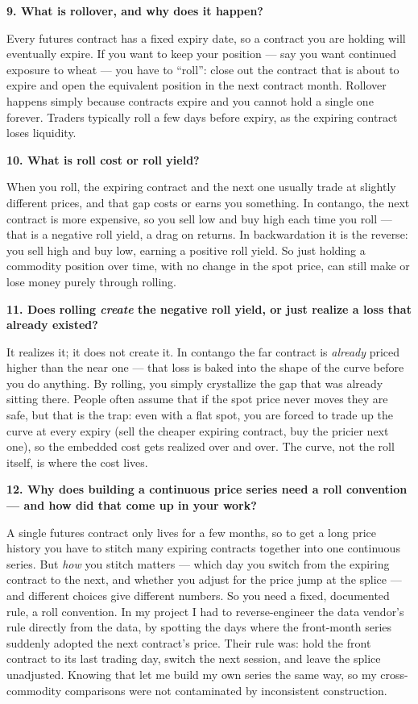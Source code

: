 \documentclass[11pt]{article}
\newcommand{\Q}[1]{\medskip\noindent\textbf{#1}\par}
\newcommand{\A}{\noindent}
\begin{document}
\Q{9. What is rollover, and why does it happen?}
\A Every futures contract has a fixed expiry date, so a contract you are holding will eventually
expire. If you want to keep your position --- say you want continued exposure to wheat --- you have
to ``roll'': close out the contract that is about to expire and open the equivalent position in the
next contract month. Rollover happens simply because contracts expire and you cannot hold a single
one forever. Traders typically roll a few days before expiry, as the expiring contract loses
liquidity.

\Q{10. What is roll cost or roll yield?}
\A When you roll, the expiring contract and the next one usually trade at slightly different prices,
and that gap costs or earns you something. In contango, the next contract is more expensive, so you
sell low and buy high each time you roll --- that is a negative roll yield, a drag on returns. In
backwardation it is the reverse: you sell high and buy low, earning a positive roll yield. So just
holding a commodity position over time, with no change in the spot price, can still make or lose money
purely through rolling.

\Q{11. Does rolling \emph{create} the negative roll yield, or just realize a loss that already
existed?}
\A It realizes it; it does not create it. In contango the far contract is \emph{already} priced
higher than the near one --- that loss is baked into the shape of the curve before you do anything. By
rolling, you simply crystallize the gap that was already sitting there. People often assume that if
the spot price never moves they are safe, but that is the trap: even with a flat spot, you are forced
to trade up the curve at every expiry (sell the cheaper expiring contract, buy the pricier next one),
so the embedded cost gets realized over and over. The curve, not the roll itself, is where the cost
lives.

\Q{12. Why does building a continuous price series need a roll convention --- and how did that come up
in your work?}
\A A single futures contract only lives for a few months, so to get a long price history you have to
stitch many expiring contracts together into one continuous series. But \emph{how} you stitch matters
--- which day you switch from the expiring contract to the next, and whether you adjust for the price
jump at the splice --- and different choices give different numbers. So you need a fixed, documented
rule, a roll convention. In my project I had to reverse-engineer the data vendor's rule directly from
the data, by spotting the days where the front-month series suddenly adopted the next contract's
price. Their rule was: hold the front contract to its last trading day, switch the next session, and
leave the splice unadjusted. Knowing that let me build my own series the same way, so my
cross-commodity comparisons were not contaminated by inconsistent construction.
\end{document}

